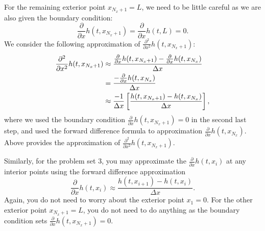 \documentclass[11pt,a4paper]{article}
\newcommand{\p}{\partial }
\begin{document}
For the remaining exterior point $x_{N_x + 1} = L$, we need to be little careful as we are also given the boundary condition: 
\begin{equation}
\frac{\p }{\p x} h(t, x_{N_x + 1}) = \frac{\p }{\p x} h(t, L) = 0.
\end{equation}
We consider the following approximation of $\frac{\p^2 }{\p x^2} h(t, x_{N_x + 1})$:
\begin{align}
\frac{\p^2 }{\p x^2} h(t, x_{N_x + 1}) &\approx \frac{\frac{\p }{\p x} h(t, x_{N_x + 1}) - \frac{\p }{\p x} h(t, x_{N_x})}{\Delta x} \notag \\
&= \frac{ - \frac{\p }{\p x} h(t, x_{N_x})}{\Delta x} \notag \\
&\approx \frac{-1}{\Delta x} \left[ \frac{h(t, x_{N_x + 1}) - h(t, x_{N_x})}{\Delta x} \right],
\end{align}
where we used the boundary condition $\frac{\p }{\p x} h(t, x_{N_x + 1}) = 0$ in the second last step, and used the forward difference formula to approximation $ \frac{\p }{\p x} h(t, x_{N_x})$. Above provides the approximation of $\frac{\p^2 }{\p x^2} h(t, x_{N_x + 1})$. 

Similarly, for the problem set 3, you may approximate the $\frac{\p }{\p x} h(t, x_i)$ at any interior points using the forward difference approximation
\begin{equation}
\frac{\p }{\p x} h(t, x_i) \approx \frac{h(t, x_{i+1}) - h(t, x_i)}{\Delta x}.
\end{equation}
Again, you do not need to worry about the exterior point $x_1 = 0$. For the other exterior point $x_{N_x + 1} = L$, you do not need to do anything as the boundary condition sets $\frac{\p }{\p x} h(t, x_{N_x + 1}) = 0$. 
\end{document}
